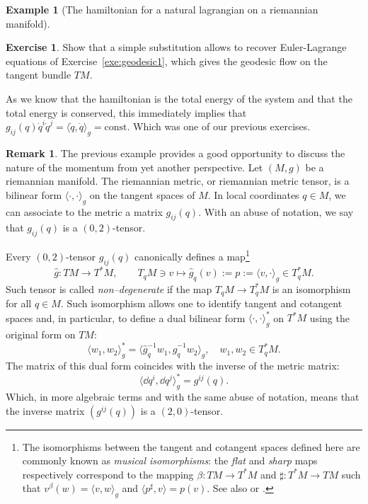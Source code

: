 \documentclass[english,fontsize=11pt,paper=b5]{scrbook}
\theoremstyle{definition}
\newtheorem{remark}{Remark}[chapter]
\newtheorem{example}{Example}[chapter]
\newtheorem{exercise}{Exercise}[chapter]
\begin{document}
\begin{example}[The hamiltonian for a natural lagrangian on a riemannian manifold]
      \begin{exercise}
        Show that a simple substitution allows to recover Euler-Lagrange equations of Exercise~\ref{exe:geodesic1}, which gives the geodesic flow on the tangent bundle $TM$.
      \end{exercise}

      As we know that the hamiltonian is the total energy of the system and that the total energy is conserved, this immediately implies that $g_{ij}(q) \dot q^i \dot q^j = \langle\dot q, \dot q\rangle_g = \mathrm{const}$.
      Which was one of our previous exercises.
    \end{example}

    \begin{remark}\label{rem:ptocot}
      The previous example provides a good opportunity to discuss the nature of the momentum from yet another perspective.
      Let $(M, g)$ be a riemannian manifold.
      The riemannian metric, or riemannian metric tensor, is a bilinear form $\langle\cdot, \cdot\rangle_g$ on the tangent spaces of $M$.
      In local coordinates $q\in M$, we can associate to the metric a matrix $g_{ij}(q)$.
      With an abuse of notation, we say that $g_{ij}(q)$ is a $(0,2)$-tensor.

      Every $(0,2)$-tensor $g_{ij}(q)$ canonically defines a map\footnote{The isomorphisms between the tangent and cotangent spaces defined here are commonly known as \emph{musical isomorphisms}: the \emph{flat} and \emph{sharp} maps respectively correspond to the mapping $\beta:TM\to T^*M$ and $\sharp:T^*M\to TM$ such that $v^\beta(w) = \langle v,w\rangle_g$ and $\langle p^\sharp, v\rangle = p(v)$.
      See also \cite[Chapter 11]{book:lee} or \cite[Example 6.1.9]{lectures:aom:seri}.}
      \begin{equation}
        \hat g: TM \to T^*M, \qquad T_q M \ni v \mapsto \hat g_q(v) := p := \langle v, \cdot\rangle_g \in T^*_q M.
      \end{equation}
      Such tensor is called \emph{non--degenerate} if the map $T_qM \to T_q^* M$ is an isomorphism for all $q\in M$.
      Such isomorphism allows one to identify tangent and cotangent spaces and, in particular, to define a dual bilinear form $\langle\cdot, \cdot\rangle_g^*$ on $T^*M$ using the original form on $TM$:
      \begin{equation}
        \langle w_1, w_2\rangle_g^* = \langle\hat g_q^{-1} w_1, \hat g_q^{-1} w_2\rangle_g, \quad w_1,w_2 \in T^*_q M.
      \end{equation}
      The matrix of this dual form coincides with the inverse of the metric matrix:
      \begin{equation}
        \langle\dd q^i, \dd q^j\rangle_g^* = g^{ij}(q).
      \end{equation}
      Which, in more algebraic terms and with the same abuse of notation, means that the inverse matrix $(g^{ij}(q))$ is a $(2,0)$-tensor.



\end{remark}
\end{document}
